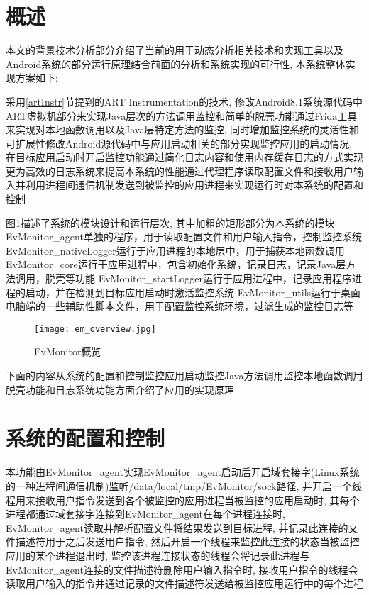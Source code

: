 \section{概述}
本文的背景技术分析部分介绍了当前的用于动态分析相关技术和实现工具以及Android系统的部分运行原理\juhao 结合前面的分析和系统实现的可行性, 本系统整体实现方案如下:

采用\ref{artInstr}节提到的ART Instrumentation的技术, 修改Android8.1系统源代码中ART虚拟机部分来实现Java层次的方法调用监控和简单的脱壳功能\juhao 通过Frida工具来实现对本地函数调用以及Java层特定方法的监控, 同时增加监控系统的灵活性和可扩展性\juhao 修改Android源代码中与应用启动相关的部分实现监控应用的启动情况, 在目标应用启动时开启监控功能\juhao 通过简化日志内容和使用内存缓存日志的方式实现更为高效的日志系统来提高本系统的性能\juhao 通过代理程序读取配置文件和接收用户输入并利用进程间通信机制发送到被监控的应用进程来实现运行时对本系统的配置和控制\juhao 

图\ref{emOverview}描述了系统的模块设计和运行层次, 其中加粗的矩形部分为本系统的模块\juhao 
EvMonitor\_agent单独的程序，用于读取配置文件和用户输入指令，控制监控系统\juhao 
EvMonitor\_nativeLogger运行于应用进程的本地层中，用于捕获本地函数调用\juhao
EvMonitor\_core运行于应用进程中，包含初始化系统，记录日志，记录Java层方法调用，脱壳等功能\juhao
EvMonitor\_startLogger运行于应用进程中，记录应用程序进程的启动，并在检测到目标应用启动时激活监控系统\juhao 
EvMonitor\_utils运行于桌面电脑端的一些辅助性脚本文件，用于配置监控系统环境，过滤生成的监控日志等
\begin{figure}[ht]
	\centering
	\texttt{[image: em\_overview.jpg]}
	\caption{EvMonitor概览}
	\label{emOverview}
\end{figure}

下面的内容从系统的配置和控制\dunhao 监控应用启动\dunhao 监控Java方法调用\dunhao 监控本地函数调用\dunhao 脱壳功能和日志系统功能方面介绍了应用的实现原理\juhao
\section{系统的配置和控制}
本功能由EvMonitor\_agent实现\juhao EvMonitor\_agent启动后开启域套接字(Linux系统的一种进程间通信机制)监听/data/local/tmp/EvMonitor/sock路径, 并开启一个线程用来接收用户指令发送到各个被监控的应用进程\juhao 当被监控的应用启动时, 其每个进程都通过域套接字连接到EvMonitor\_agent\juhao 在每个进程连接时, EvMonitor\_agent读取并解析配置文件将结果发送到目标进程, 并记录此连接的文件描述符用于之后发送用户指令, 然后开启一个线程来监控此连接的状态\juhao 当被监控应用的某个进程退出时, 监控该进程连接状态的线程会将记录此进程与EvMonitor\_agent连接的文件描述符删除\juhao 用户输入指令时, 接收用户指令的线程会读取用户输入的指令并通过记录的文件描述符发送给被监控应用运行中的每个进程\juhao 

